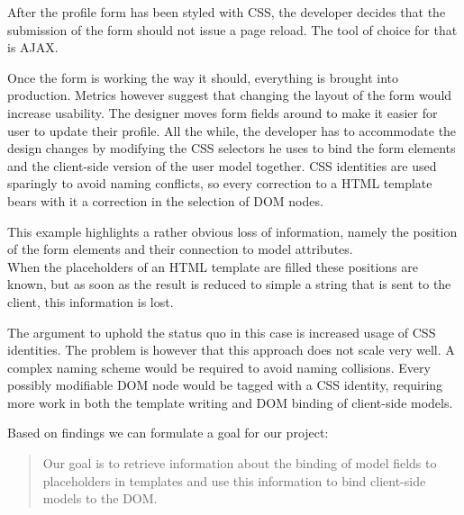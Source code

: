 \documentclass[thesis.tex]{subfiles}
\begin{document}
\begin{shaded}
\label{sec:scenario}
After the profile form has been styled with CSS, the developer decides that
the submission of the form should not issue a page reload. The tool of choice
for that is AJAX.

Once the form is working the way it should, everything is brought into
production. Metrics however suggest that changing the layout of the form would
increase usability.
The designer moves form fields around to make it easier for user to update
their profile.
All the while, the developer has to accommodate the design changes by modifying
the CSS selectors he uses to bind the form elements and the client-side version
of the user model together.
CSS identities are used sparingly to avoid naming conflicts, so every correction
to a HTML template bears with it a correction in the selection of DOM nodes.
\end{shaded}
This example highlights a rather obvious loss of information, namely
the position of the form elements and their connection to model attributes.\\
When the placeholders of an HTML template are filled these positions are known,
but as soon as the result is reduced to simple a string that is sent
to the client, this information is lost.

The argument to uphold the status quo in this case is increased usage of
CSS identities. The problem is however that this approach does not scale very well.
A complex naming scheme would be required to avoid naming collisions.
Every possibly modifiable DOM node would be tagged with a CSS identity,
requiring more work in both the template writing and DOM binding of
client-side models.

Based on findings we can formulate a goal for our project:
\begin{quote}
Our goal is to retrieve information about the binding of model fields to
placeholders in templates and use this information to bind client-side
models to the DOM.
\end{quote}
\end{document}
